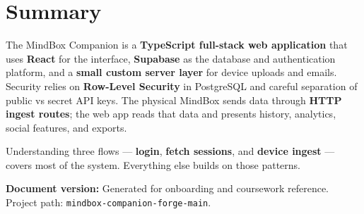 \documentclass[11pt,a4paper]{article}
\newcommand{\filepath}[1]{\texttt{#1}}
\begin{document}
\section{Summary}

The MindBox Companion is a \textbf{TypeScript full-stack web application} that uses \textbf{React} for the interface, \textbf{Supabase} as the database and authentication platform, and a \textbf{small custom server layer} for device uploads and emails. Security relies on \textbf{Row-Level Security} in PostgreSQL and careful separation of public vs secret API keys. The physical MindBox sends data through \textbf{HTTP ingest routes}; the web app reads that data and presents history, analytics, social features, and exports.

Understanding three flows --- \textbf{login}, \textbf{fetch sessions}, and \textbf{device ingest} --- covers most of the system. Everything else builds on those patterns.

\vspace{1em}
\noindent\textbf{Document version:} Generated for onboarding and coursework reference. Project path: \filepath{mindbox-companion-forge-main}.
\end{document}
